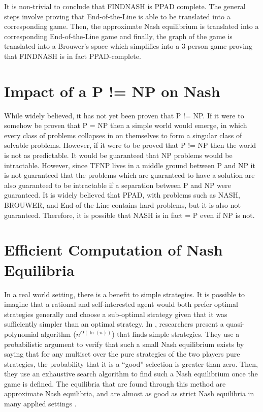 \documentclass[10pt]{article}
\theoremstyle{definition}
\theoremstyle{remark}
\theoremstyle{definition}
\begin{document}
It is non-trivial to conclude that FINDNASH is PPAD complete. The general steps involve proving that End-of-the-Line is able to be translated into a corresponding game. Then, the approximate Nash equilibrium is translated into a corresponding End-of-the-Line game and finally, the graph of the game is translated into a Brouwer’s space which simplifies into a 3 person game proving that FINDNASH is in fact PPAD-complete. 

\section{Impact of a P != NP on Nash}
While widely believed, it has not yet been proven that P != NP. If it were to somehow be proven that P = NP then a simple world would emerge, in which every class of problems collapses in on themselves to form a singular class of solvable problems. However, if it were to be proved that P != NP then the world is not as predictable. It would be guaranteed that NP problems would be intractable. However, since TFNP lives in a middle ground between P and NP it is not guaranteed that the problems which are guaranteed to have a solution are also guaranteed to be intractable if a separation between P and NP were guaranteed. It is widely believed that PPAD, with problems such as NASH, BROUWER, and End-of-the-Line contains hard problems, but it is also not guaranteed. Therefore, it is possible that NASH is in fact = P even if NP is not. 

\section{Efficient Computation of Nash Equilibria}
In a real world setting, there is a benefit to simple strategies. It is possible to imagine that a rational and self-interested agent would both prefer optimal strategies generally and choose a sub-optimal strategy given that it was sufficiently simpler than an optimal strategy. In \cite{lipton2003playing}, researchers present a quasi-polynomial algorithm ($n^{O(\ln (n))}$) that finds simple strategies. They use a probabilistic argument to verify that such a small Nash equilibrium exists by saying that for any multiset over the pure strategies of the two players pure strategies, the probability that it is a “good” selection is greater than zero. Then, they use an exhaustive search algorithm to find such a Nash equilibrium once the game is defined. The equilibria that are found through this method are approximate Nash equilibria, and are almost as good as strict Nash equilibria in many applied settings \cite{lipton2003playing}. 




\end{document}
